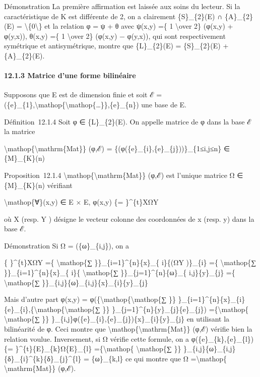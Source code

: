 \documentclass[]{article}
\begin{document}
Démonstration La première affirmation est laissée aux soins du lecteur.
Si la caractéristique de K est différente de 2, on a clairement
\{S\}\_\{2\}(E) ∩ \{A\}\_\{2\}(E) =
\textbackslash{}\{0\textbackslash{}\} et la relation φ = ψ + θ avec
ψ(x,y) =\{ 1 \textbackslash{}over 2\} (φ(x,y) + φ(y,x)), θ(x,y) =\{ 1
\textbackslash{}over 2\} (φ(x,y) − φ(y,x)), qui sont respectivement
symétrique et antisymétrique, montre que \{L\}\_\{2\}(E) =
\{S\}\_\{2\}(E) + \{A\}\_\{2\}(E).

\paragraph{12.1.3 Matrice d'une forme bilinéaire}

Supposons que E est de dimension finie et soit ℰ =
(\{e\}\_\{1\},\textbackslash{}mathop\{\textbackslash{}mathop\{\ldots{}\}\},\{e\}\_\{n\})
une base de E.

Définition~12.1.4 Soit φ ∈ \{L\}\_\{2\}(E). On appelle matrice de φ dans
la base ℰ la matrice

\textbackslash{}mathop\{\textbackslash{}mathrm\{Mat\}\} (φ,ℰ) =
\{(φ(\{e\}\_\{i\},\{e\}\_\{j\}))\}\_\{1≤i,j≤n\} ∈ \{M\}\_\{K\}(n)

Proposition~12.1.4
\textbackslash{}mathop\{\textbackslash{}mathrm\{Mat\}\} (φ,ℰ) est
l'unique matrice Ω ∈ \{M\}\_\{K\}(n) vérifiant

\textbackslash{}mathop\{∀\}(x,y) ∈ E × E, φ(x,y) \{= \}\^{}\{t\}XΩY

où X (resp. Y ) désigne le vecteur colonne des coordonnées de x (resp.
y) dans la base ℰ.

Démonstration Si Ω = (\{ω\}\_\{i,j\}), on a

\{ \}\^{}\{t\}XΩY =\{ \textbackslash{}mathop\{∑
\}\}\_\{i=1\}\^{}\{n\}\{x\}\_\{ i\}\{(ΩY )\}\_\{i\} =\{
\textbackslash{}mathop\{∑ \}\}\_\{i=1\}\^{}\{n\}\{x\}\_\{ i\}\{
\textbackslash{}mathop\{∑ \}\}\_\{j=1\}\^{}\{n\}\{ω\}\_\{
i,j\}\{y\}\_\{j\} =\{ \textbackslash{}mathop\{∑
\}\}\_\{i,j\}\{ω\}\_\{i,j\}\{x\}\_\{i\}\{y\}\_\{j\}

Mais d'autre part φ(x,y) =
φ(\{\textbackslash{}mathop\{\textbackslash{}mathop\{∑ \}\}
\}\_\{i=1\}\^{}\{n\}\{x\}\_\{i\}\{e\}\_\{i\},\{\textbackslash{}mathop\{\textbackslash{}mathop\{∑
\}\} \}\_\{j=1\}\^{}\{n\}\{y\}\_\{j\}\{e\}\_\{j\})
=\{\textbackslash{}mathop\{ \textbackslash{}mathop\{∑ \}\}
\}\_\{i,j\}φ(\{e\}\_\{i\},\{e\}\_\{j\})\{x\}\_\{i\}\{y\}\_\{j\} en
utilisant la bilinéarité de φ. Ceci montre que
\textbackslash{}mathop\{\textbackslash{}mathrm\{Mat\}\} (φ,ℰ) vérifie
bien la relation voulue. Inversement, si Ω vérifie cette formule, on a
φ(\{e\}\_\{k\},\{e\}\_\{l\}) \{= \}\^{}\{t\}\{E\}\_\{k\}Ω\{E\}\_\{l\}
=\{\textbackslash{}mathop\{ \textbackslash{}mathop\{∑ \}\}
\}\_\{i,j\}\{ω\}\_\{i,j\}\{δ\}\_\{i\}\^{}\{k\}\{δ\}\_\{j\}\^{}\{l\} =
\{ω\}\_\{k,l\} ce qui montre que Ω =\textbackslash{}mathop\{
\textbackslash{}mathrm\{Mat\}\} (φ,ℰ).
\end{document}
